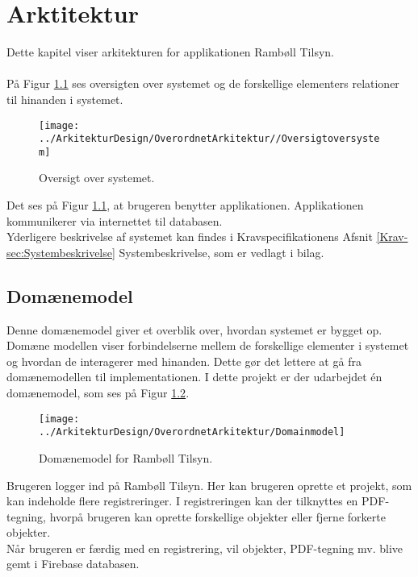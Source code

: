 \chapter{Arktitektur}
Dette kapitel viser arkitekturen for applikationen Rambøll Tilsyn.\label{sec:Arkitektur} \\ \\ 
På Figur \ref{fig:OversigtSystembeskrivelse} ses oversigten over systemet og de forskellige elementers relationer til hinanden i systemet.
\begin{figure}[H] %
	\centering
	\texttt{[image: ../ArkitekturDesign/OverordnetArkitektur//Oversigtoversystem]}
	\caption{Oversigt over systemet.}
	\label{fig:OversigtSystembeskrivelse}
\end{figure}
Det ses på Figur \ref{fig:OversigtSystembeskrivelse}, at brugeren benytter applikationen. Applikationen kommunikerer via internettet til databasen. \\
Yderligere beskrivelse af systemet kan findes i Kravspecifikationens Afsnit \ref{Krav-sec:Systembeskrivelse} Systembeskrivelse, som er vedlagt i bilag.

\clearpage

\section{Domænemodel}
Denne domænemodel giver et overblik over, hvordan systemet er bygget op. Domæne modellen viser forbindelserne mellem de forskellige elementer i systemet og hvordan de interagerer med hinanden. Dette gør det lettere at gå fra domænemodellen til implementationen.
I dette projekt er der udarbejdet én domænemodel, som ses på Figur \ref{fig:Domain}.

\begin{figure}[H] %
	\centering
	\texttt{[image: ../ArkitekturDesign/OverordnetArkitektur/Domainmodel]}
	\caption{Domænemodel for Rambøll Tilsyn.}
	\label{fig:Domain}
\end{figure}
Brugeren logger ind på Rambøll Tilsyn. Her kan brugeren oprette et projekt, som kan indeholde flere registreringer. I registreringen kan der tilknyttes en PDF-tegning, hvorpå brugeren kan oprette forskellige objekter eller fjerne forkerte objekter. \\
Når brugeren er færdig med en registrering, vil objekter, PDF-tegning mv. blive gemt i Firebase databasen.

\clearpage

